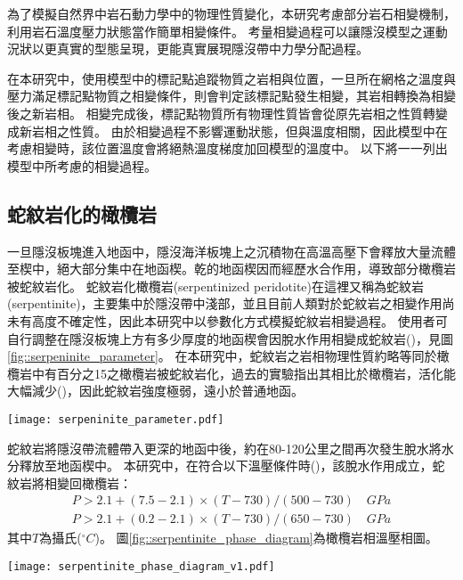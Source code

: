 為了模擬自然界中岩石動力學中的物理性質變化，本研究考慮部分岩石相變機制，利用岩石溫度壓力狀態當作簡單相變條件。
考量相變過程可以讓隱沒模型之運動況狀以更真實的型態呈現，更能真實展現隱沒帶中力學分配過程。

在本研究中，使用模型中的標記點追蹤物質之岩相與位置，一旦所在網格之溫度與壓力滿足標記點物質之相變條件，則會判定該標記點發生相變，其岩相轉換為相變後之新岩相。
相變完成後，標記點物質所有物理性質皆會從原先岩相之性質轉變成新岩相之性質。
由於相變過程不影響運動狀態，但與溫度相關，因此模型中在考慮相變時，該位置溫度會將絕熱溫度梯度加回模型的溫度中。
以下將一一列出模型中所考慮的相變過程。

\subsection{蛇紋岩化的橄欖岩}\label{蛇紋岩化的橄欖岩}
一旦隱沒板塊進入地函中，隱沒海洋板塊上之沉積物在高溫高壓下會釋放大量流體至楔中，絕大部分集中在地函楔。乾的地函楔因而經歷水合作用，導致部分橄欖岩被蛇紋岩化。
蛇紋岩化橄欖岩(serpentinized peridotite)在這裡又稱為蛇紋岩(serpentinite)，主要集中於隱沒帶中淺部，並且目前人類對於蛇紋岩之相變作用尚未有高度不確定性，因此本研究中以參數化方式模擬蛇紋岩相變過程。
使用者可自行調整在隱沒板塊上方有多少厚度的地函楔會因脫水作用相變成蛇紋岩(\citealp{Tan2012})，見圖\ref{fig::serpeninite_parameter}。
在本研究中，蛇紋岩之岩相物理性質約略等同於橄欖岩中有百分之15之橄欖岩被蛇紋岩化，過去的實驗指出其相比於橄欖岩，活化能大幅減少(\citealp{hilairet2007high})，因此蛇紋岩強度極弱，遠小於普通地函。

\begin{figure*}[ht!]
    \centering
    \texttt{[image: serpeninite\_parameter.pdf]}
    \caption[蛇紋岩參數化示意圖]{蛇紋岩參數化示意圖。於模型隱沒板塊上，海洋地殼玄武岩相變成榴輝岩深度後25公里深之上的地函會生成h公里厚的蛇紋岩。}
    \label{fig::serpeninite_parameter}
\end{figure*}

蛇紋岩將隱沒帶流體帶入更深的地函中後，約在80-120公里之間再次發生脫水將水分釋放至地函楔中。
本研究中，在符合以下溫壓條件時(\citealp{Ulmer1995})，該脫水作用成立，蛇紋岩將相變回橄欖岩：
\begin{align}
P > 2.1 + (7.5-2.1)\times (T-730)/(500-730) \quad GPa \\
P > 2.1 + (0.2-2.1) \times (T-730)/(650-730) \quad GPa
\end{align}
其中$T$為攝氏($^\circ C$)。
圖\ref{fig::serpentinite_phase_diagram}為橄欖岩相溫壓相圖。
\begin{figure*}[h!]
    \centering
    \texttt{[image: serpentinite\_phase\_diagram\_v1.pdf]}
    \caption[橄欖岩相圖，參考\citealp{Ulmer1995}]{橄欖岩相圖。紫線代表蛇紋岩脫水回橄欖岩之相變圖，參考\citealp{Ulmer1995}；綠線與黃線分別代表橄欖岩的乾固相線(dry solidus)與含水固相線(wet solidus)，摘自\citealp{katz2003new}。另用灰線實線與虛線分別表示墨西哥參考模型之海洋岩石圈與大陸岩石圈地溫梯度。}
    \label{fig::serpentinite_phase_diagram}
\end{figure*}

